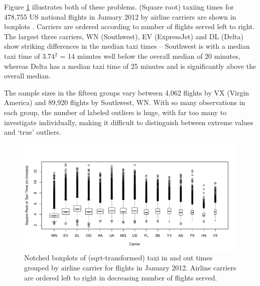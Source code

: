 \documentclass[12pt,oneside]{article}
\begin{document}
Figure \ref{fig:taxi-bp} illustrates both of these problems.  (Square root) taxiing times  for 478,755 US national flights in January 2012 by airline carriers are shown in boxplots .  Carriers are ordered according to number of flights served left to right. The largest three carriers, WN (Southwest), EV (ExpressJet)  and DL (Delta) show striking differences in the median taxi times -- Southwest is with a median taxi time of 3.74$^2$ = 14 minutes well below the overall median of 20 minutes, whereas Delta has a median taxi time of 25 minutes and is significantly above the overall median.

The sample sizes in the fifteen groups vary between 4,062 flights by VX (Virgin America) and 89,920 flights by Southwest, WN. 
With so many
observations in each group, the number of labeled outliers is huge, with
far too many to investigate individually, making it difficult to distinguish
between extreme values and `true' outliers.

%
%

\begin{figure}[hbtp]
  \centering
  \includegraphics[width=\linewidth]{taxi-bp}

  \caption{Notched boxplots \citep{variations.boxplots} of (sqrt-transformed)
  taxi in and out times grouped by airline carrier for flights in January 2012. Airline carriers are ordered left to right in decreasing  number of flights served. }

  \label{fig:taxi-bp} 
\end{figure}
\end{document}
